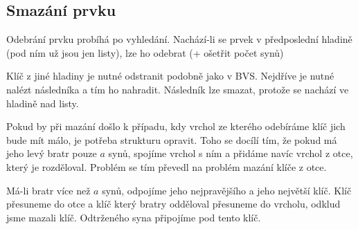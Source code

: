 
\subsection{Smazání prvku}

Odebrání prvku probíhá po vyhledání.
Nachází-li se prvek v předposlední hladině (pod ním už jsou jen listy), lze ho odebrat (+ ošetřit počet synů)

Klíč z jiné hladiny je nutné odstranit podobně jako v BVS.
Nejdříve je nutné nalézt následníka a tím ho nahradit.
Následník lze smazat, protože se nachází ve hladině nad listy.

Pokud by při mazání došlo k případu, kdy vrchol ze kterého odebíráme klíč jich bude mít málo, je potřeba strukturu opravit.
Toho se docílí tím, že pokud má jeho levý bratr pouze $a$ synů, spojíme vrchol s ním a přidáme navíc vrchol z otce, který je rozděloval.
Problém se tím převedl na problém mazání klíče z otce.

Má-li bratr více než $a$ synů, odpojíme jeho nejpravějšího a jeho největší klíč.
Klíč přesuneme do otce a klíč který bratry odděloval přesuneme do vrcholu, odklud jsme mazali klíč.
Odtrženého syna připojíme pod tento klíč.
